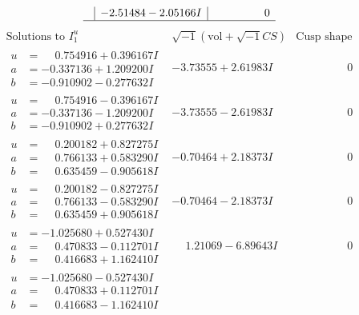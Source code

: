 \documentclass[1p]{elsarticle_modified}
\theoremstyle{definition}
\newcommand{\I}{\sqrt{-1}}
\begin{document}
$$\begin{array}{c|c|c}
 & -2.51484 - 2.05166 I & \phantom{-0.000000 } 0\\
 \hline 
 \end{array}$$\newpage$$\begin{array}{c|c|c}  
\text{Solutions to }I^u_{1}& \I (\text{vol} + \sqrt{-1}CS) & \text{Cusp shape}\\
 \hline 
\begin{aligned}
u &= \phantom{-}0.754916 + 0.396167 I \\
a &= -0.337136 + 1.209200 I \\
b &= -0.910902 - 0.277632 I\end{aligned}
 & -3.73555 + 2.61983 I & \phantom{-0.000000 } 0 \\ \hline\begin{aligned}
u &= \phantom{-}0.754916 - 0.396167 I \\
a &= -0.337136 - 1.209200 I \\
b &= -0.910902 + 0.277632 I\end{aligned}
 & -3.73555 - 2.61983 I & \phantom{-0.000000 } 0 \\ \hline\begin{aligned}
u &= \phantom{-}0.200182 + 0.827275 I \\
a &= \phantom{-}0.766133 + 0.583290 I \\
b &= \phantom{-}0.635459 - 0.905618 I\end{aligned}
 & -0.70464 + 2.18373 I & \phantom{-0.000000 } 0 \\ \hline\begin{aligned}
u &= \phantom{-}0.200182 - 0.827275 I \\
a &= \phantom{-}0.766133 - 0.583290 I \\
b &= \phantom{-}0.635459 + 0.905618 I\end{aligned}
 & -0.70464 - 2.18373 I & \phantom{-0.000000 } 0 \\ \hline\begin{aligned}
u &= -1.025680 + 0.527430 I \\
a &= \phantom{-}0.470833 - 0.112701 I \\
b &= \phantom{-}0.416683 + 1.162410 I\end{aligned}
 & \phantom{-}1.21069 - 6.89643 I & \phantom{-0.000000 } 0 \\ \hline\begin{aligned}
u &= -1.025680 - 0.527430 I \\
a &= \phantom{-}0.470833 + 0.112701 I \\
b &= \phantom{-}0.416683 - 1.162410 I\end{aligned}

\end{array}$$
\end{document}
